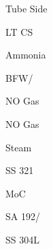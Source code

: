 \documentclass[a4paper,portrait,12pt]{article}
\begin{document}
\begin{flushleft}
Tube Side
\end{flushleft}





\begin{flushleft}
LT CS
\end{flushleft}





\begin{flushleft}
Ammonia
\end{flushleft}





\begin{flushleft}
BFW/
\end{flushleft}





\begin{flushleft}
NO Gas
\end{flushleft}





\begin{flushleft}
NO Gas
\end{flushleft}





\begin{flushleft}
Steam
\end{flushleft}


\begin{flushleft}
SS 321
\end{flushleft}





\begin{flushleft}
MoC
\end{flushleft}





\begin{flushleft}
SA 192/
\end{flushleft}





\begin{flushleft}
SS 304L
\end{flushleft}
\end{document}
